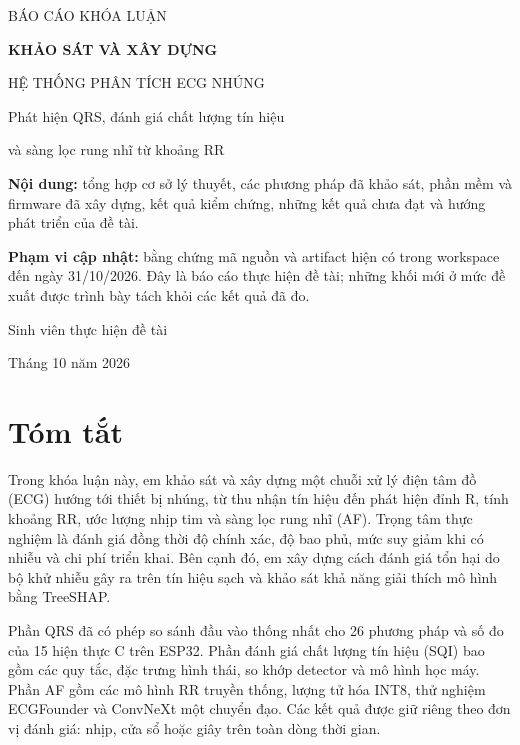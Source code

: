 \documentclass[12pt,a4paper,oneside]{report}
\begin{document}
\begin{titlepage}
\centering
\vspace*{1cm}
{\Large BÁO CÁO KHÓA LUẬN\par}
\vspace{1.4cm}
{\LARGE\bfseries KHẢO SÁT VÀ XÂY DỰNG\par HỆ THỐNG PHÂN TÍCH ECG NHÚNG\par}
\vspace{0.5cm}
{\Large Phát hiện QRS, đánh giá chất lượng tín hiệu\par và sàng lọc rung nhĩ từ khoảng RR\par}
\vspace{1.3cm}
\begin{minipage}{0.86\textwidth}
\textbf{Nội dung:} tổng hợp cơ sở lý thuyết, các phương pháp đã khảo sát, phần mềm và firmware đã xây dựng, kết quả kiểm chứng, những kết quả chưa đạt và hướng phát triển của đề tài.

\medskip
\textbf{Phạm vi cập nhật:} bằng chứng mã nguồn và artifact hiện có trong workspace đến ngày 31/10/2026. Đây là báo cáo thực hiện đề tài; những khối mới ở mức đề xuất được trình bày tách khỏi các kết quả đã đo.
\end{minipage}
\vfill
{\large Sinh viên thực hiện đề tài\par}
\vspace{0.4cm}
{\large Tháng 10 năm 2026\par}
\end{titlepage}

\chapter*{Tóm tắt}
Trong khóa luận này, em khảo sát và xây dựng một chuỗi xử lý điện tâm đồ (ECG) hướng tới thiết bị nhúng, từ thu nhận tín hiệu đến phát hiện đỉnh R, tính khoảng RR, ước lượng nhịp tim và sàng lọc rung nhĩ (AF). Trọng tâm thực nghiệm là đánh giá đồng thời độ chính xác, độ bao phủ, mức suy giảm khi có nhiễu và chi phí triển khai. Bên cạnh đó, em xây dựng cách đánh giá tổn hại do bộ khử nhiễu gây ra trên tín hiệu sạch và khảo sát khả năng giải thích mô hình bằng TreeSHAP.

Phần QRS đã có phép so sánh đầu vào thống nhất cho 26 phương pháp và số đo của 15 hiện thực C trên ESP32. Phần đánh giá chất lượng tín hiệu (SQI) bao gồm các quy tắc, đặc trưng hình thái, so khớp detector và mô hình học máy. Phần AF gồm các mô hình RR truyền thống, lượng tử hóa INT8, thử nghiệm ECGFounder và ConvNeXt một chuyển đạo. Các kết quả được giữ riêng theo đơn vị đánh giá: nhịp, cửa sổ hoặc giây trên toàn dòng thời gian.
\end{document}
